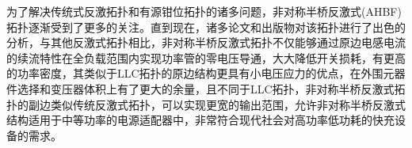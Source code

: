 为了解决传统式反激拓扑和有源钳位拓扑的诸多问题，非对称半桥反激式(AHBF)拓扑逐渐受到了更多的关注。直到现在，诸多论文和出版物对该拓扑进行了出色的分析\cite{chen2002analysis,kim2012analysis,huber2017analysis}，与其他反激式拓扑相比，非对称半桥反激式拓扑不仅能够通过原边电感电流的续流特性在全负载范围内实现功率管的零电压导通，大大降低开关损耗，有更高的功率密度，其类似于LLC拓扑的原边结构更具有小电压应力的优点，在外围元器件选择和变压器体积上有了更大的余量，且不同于LLC拓扑，非对称半桥反激式拓扑的副边类似传统反激式拓扑，可以实现更宽的输出范围，允许非对称半桥反激式结构适用于中等功率的电源适配器中，非常符合现代社会对高功率低功耗的快充设备的需求。





